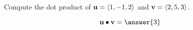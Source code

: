 \documentclass{ximera}
\author{Gregory Hartman \and Matthew Carr}
\begin{document}
\begin{exercise}




Compute the dot product of $\mathbf{u}=\left\langle 1,-1,2\right\rangle$ and $\mathbf{v}=\left\langle 2,5,3\right\rangle$.

\begin{prompt}
\[
\vec{u}\dotp\vec{v}=\answer{3}
\]
\end{prompt}

\end{exercise}
\end{document}
